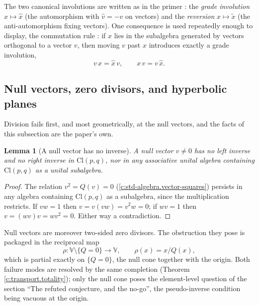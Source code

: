 \documentclass[11pt]{article}
\newtheorem{lemma}[theorem]{Lemma}
\theoremstyle{definition}
\theoremstyle{plain}
\newcommand{\changedmark}[2]{\marginpar{\raggedright\scriptsize\color{#1}#2}}
\providecommand{\Cl}{}\renewcommand{\Cl}{\mathrm{Cl}}
\begin{document}
The two canonical involutions are written as in the primer \cite[Section 5]{ButlerT0}: the \emph{grade involution} $x \mapsto \hat{x}$ (the automorphism with $\hat{v} = -v$ on vectors) and the \emph{reversion} $x \mapsto \tilde{x}$ (the anti-automorphism fixing vectors). One consequence is used repeatedly enough to display, the commutation rule \cite[Lemma 9.1]{ButlerT0}: if $x$ lies in the subalgebra generated by vectors orthogonal to a vector $v$, then moving $v$ past $x$ introduces exactly a grade involution,
\begin{equation}
v\,x = \hat{x}\,v, \qquad x\,v = v\,\hat{x}.
\end{equation}

\subsection*{Null vectors, zero divisors, and hyperbolic planes}
\label{c:note.transport.setting-null-vectors-zero-divisors-hyperbolic}
Division fails first, and most geometrically, at the null vectors, and the facts of this subsection are the paper's own.

\begin{lemma}[A null vector has no inverse]\label{c:transport.noinverse}
\changedmark{gray}{reworded}
A null vector $v \neq 0$ has no left inverse and no right inverse in $\Cl(p,q)$, nor in any associative unital algebra containing $\Cl(p,q)$ as a unital subalgebra.
\end{lemma}
\begin{proof}
The relation $v^2 = Q(v) = 0$ (\ref{c:std-algebra.vector-squares}) persists in any algebra containing $\Cl(p,q)$ as a subalgebra, since the multiplication restricts. If $vw = 1$ then $v = v(vw) = v^2 w = 0$; if $wv = 1$ then $v = (wv)v = wv^2 = 0$. Either way a contradiction.

\end{proof}

\label{c:note.transport.setting-null-vectors-zero-divisors-hyperbolic-2}
Null vectors are moreover two-sided zero divisors. The obstruction they pose is packaged in the reciprocal map
\[
\rho : \mathbb{V} \setminus \{Q = 0\} \to \mathbb{V}, \qquad \rho(x) = x / Q(x),
\]
which is partial exactly on $\{Q = 0\}$, the null cone together with the origin. Both failure modes are resolved by the same completion (Theorem \ref{c:transport.totality}); only the null cone poses the element-level question of the section ``The refuted conjecture, and the no-go'', the pseudo-inverse condition being vacuous at the origin.
\end{document}
